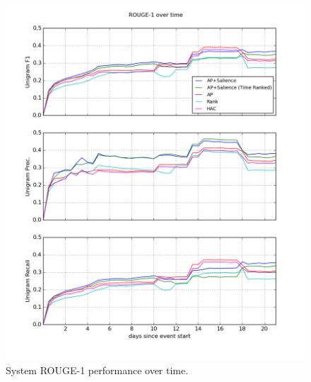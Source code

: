 \begin{figure}
  \includegraphics[width=\textwidth]{rouge-time.png}
\caption{System ROUGE-1 performance over time.}
\label{fig:trouge}
\end{figure}
